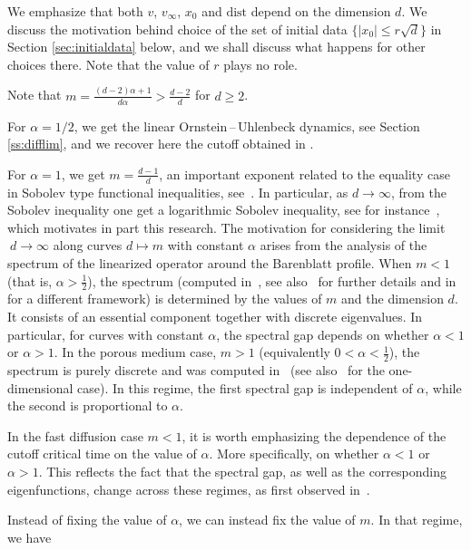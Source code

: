 \documentclass[10pt,reqno]{amsart}
\numberwithin{equation}{section}
\begin{document}
We emphasize that both $v$, $v_\infty$, $x_0$ and $\mathrm{dist}$ depend on the dimension $d$. We discuss the motivation behind choice of the set of initial data $\{|x_0| \leq r\sqrt{d}\}$ in Section \ref{sec:initialdata} below, and we shall discuss what happens for other choices there. Note that the value of $r$ plays no role. 

Note that $m=\frac{(d-2)\alpha+1}{d\alpha}>\frac{d-2}{d}$ for $d\geq2$.

For $\alpha=1/2$, we get the linear Ornstein\,--\,Uhlenbeck dynamics, see Section \ref{ss:difflim}, and we recover here the cutoff obtained in \cite{MR4528974}. 

For $\alpha=1$, we get $m=\frac{d-1}{d}$, an important exponent related to the equality case in Sobolev type functional inequalities, see~\cite{bonforte:hal-02887010}. In particular, as $d\to\infty$, from the Sobolev inequality one get a logarithmic Sobolev inequality, see for instance~\cite{arXiv:2209.08651}, which motivates in part this research.  The motivation for considering the limit $\ d\to\infty $ along curves $ d\mapsto m$ with constant $ \alpha $ arises from the analysis of the spectrum of the linearized operator around the Barenblatt profile. 
When $m < 1$ (that is, $\alpha > \frac{1}{2}$), the spectrum (computed in~\cite{zbMATH02187606}, see also~\cite{zbMATH02155995} for further details and in~\cite{zbMATH06133917} for a different framework) is determined by the values of $m$ and the dimension $d$. It consists of an essential component together with discrete eigenvalues.  In particular, for curves with constant $\alpha$, the spectral gap depends on whether $\alpha < 1$ or $\alpha > 1$. In the porous medium case, $m > 1$ (equivalently $0 < \alpha < \frac{1}{2}$), the spectrum is purely discrete and was computed in~\cite{zbMATH06262313} (see also~\cite{zbMATH04096011} for the one-dimensional case). In this regime, the first spectral gap is independent of $\alpha$, while the second is proportional to $\alpha$. 

In the fast diffusion case $m < 1$, it is worth emphasizing the dependence of the cutoff critical time on the value of $\alpha$. More specifically, on whether $\alpha < 1$ or $\alpha > 1$. This reflects the fact that the spectral gap, as well as the corresponding eigenfunctions, change across these regimes, as first observed in~\cite{zbMATH02187606}.





Instead of fixing the value of $\alpha$, we can instead fix the value of $m$. In that regime, we have
\end{document}
